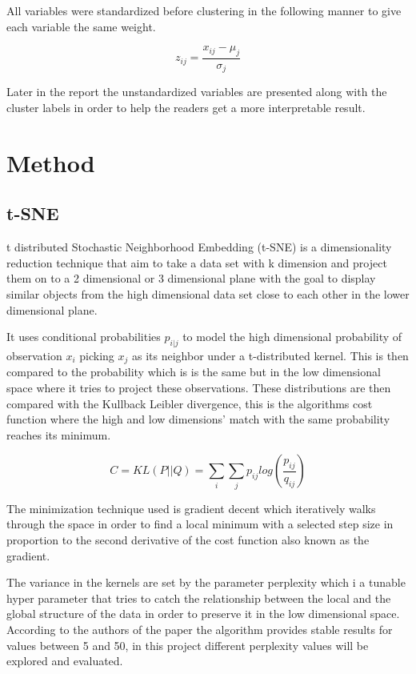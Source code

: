 \documentclass{article}
\begin{document}
All variables were standardized before clustering in the following manner to give each variable the same weight.

 $$z_{ij} = \frac{x_{ij} - \mu_{j}}{\sigma_{j}}$$ 

Later in the report the unstandardized variables are presented along with the cluster labels in order to help the readers get a more interpretable result.


\newpage


\section{Method}

\subsection{t-SNE}


t distributed Stochastic Neighborhood Embedding (t-SNE) is a dimensionality reduction technique that aim to take a data set with k dimension and project them on to a 2 dimensional or 3 dimensional plane with the goal to display similar objects from the high dimensional data set close to each other in the lower dimensional plane.

It uses conditional probabilities $p_{i|j}$  to model the high dimensional probability of observation $x_i$ picking $x_j$ as its neighbor under a t-distributed kernel. This is then compared to the probability  which is is the same but in the low dimensional space where it tries to project these observations. These distributions are then compared with the Kullback Leibler divergence, this is the algorithms cost function where the high and low dimensions’ match with the same probability reaches its minimum.

$$C = KL(P||Q)=\sum_i\sum_jp_{ij}log(\frac{p_{ij}}{q_{ij}})$$

The minimization technique used is gradient decent which iteratively walks through the space in order to find a local minimum with a selected step size in proportion to the second derivative of the cost function also known as the gradient.

The variance in the kernels are set by the parameter perplexity which i a tunable hyper parameter that tries to catch the relationship between the local and the global structure of the data in order to preserve it in the low dimensional space. According to the authors of the paper the algorithm provides stable results for values between 5 and 50, in this project different perplexity values will be explored and evaluated.
\end{document}
